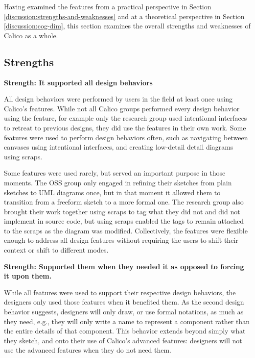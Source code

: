 Having examined the features from a practical perspective in Section \ref{discussion:strengths-and-weaknesses} and at a theoretical perspective in Section \ref{discussion:cog-dim}, this section examines the overall strengths and weaknesses of Calico as a whole.

\subsection{Strengths}

\textbf{Strength: It supported all design behaviors}

All design behaviors were performed by users in the field at least once using Calico's features. While not all Calico groups performed every design behavior using the feature, for example only the research group used intentional interfaces to retreat to previous designs, they did use the features in their own work. Some features were used to perform design behaviors often, such as navigating between canvases using intentional interfaces, and creating low-detail detail diagrams using scraps. 

Some features were used rarely, but served an important purpose in those moments. The OSS group only engaged in refining their sketches from plain sketches to UML diagrams once, but in that moment it allowed them to transition from a freeform sketch to a more formal one. The research group also brought their work together using scraps to tag what they did not and did not implement in source code, but using scraps enabled the tags to remain attached to the scraps as the diagram was modified. Collectively, the features were flexible enough to address all design features without requiring the users to shift their context or shift to different modes.

\textbf{Strength: Supported them when they needed it as opposed to forcing it upon them.}

While all features were used to support their respective design behaviors, the designers only used those features when it benefited them. As the second design behavior suggests, designers will only draw, or use formal notations, as much as they need, e.g., they will only write a name to represent a component rather than the entire details of that component. This behavior extends beyond simply what they sketch, and onto their use of Calico's advanced features: designers will not use the advanced features when they do not need them.

